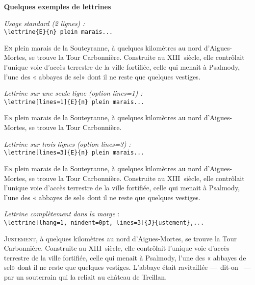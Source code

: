 \documentclass[12pt,a4paper]{article}
\begin{document}
\thispagestyle{empty}

\begin{center}
\large\bfseries Quelques exemples de lettrines
\end{center}

\vspace{\baselineskip}
\textit{Usage standard (2 lignes) :}\\
\verb+\lettrine{E}{n} plein marais...+

\lettrine{E}{n} plein marais de la Souteyranne, à quelques kilomètres
au nord d'Aigues-Mortes, se trouve la Tour Carbonnière.
Construite au XIII\ieme~siècle, elle contrôlait l'unique voie d'accès
terrestre de la ville fortifiée, celle qui menait à Psalmody,
l'une des « abbayes de sel» dont il ne reste que quelques vestiges.

\vspace{\baselineskip}
\textit{Lettrine sur une seule ligne (option {\ttfamily\upshape lines=1}) :}\\
\verb+\lettrine[lines=1]{E}{n} plein marais...+

\lettrine[lines=1]{E}{n} plein marais de la Souteyranne,
à quelques kilomètres au nord d'Aigues-Mortes, se trouve
la Tour Carbonnière.

\vspace{\baselineskip}
\textit{Lettrine sur trois lignes (option {\ttfamily\upshape lines=3}) :}\\
\verb+\lettrine[lines=3]{E}{n} plein marais...+

\lettrine[lines=3]{E}{n} plein marais de la Souteyranne,
à quelques kilomètres au nord d'Aigues-Mortes,
se trouve la Tour Carbonnière.
Construite au XIII\ieme~siècle, elle contrôlait l'unique voie d'accès
terrestre de la ville fortifiée, celle qui menait à Psalmody,
l'une des « abbayes de sel» dont il ne reste que quelques vestiges.

\vspace{\baselineskip}
\textit{Lettrine complètement dans la marge} :\\
\verb+\lettrine[lhang=1, nindent=0pt, lines=3]{J}{ustement},...+

\lettrine[lhang=1, nindent=0pt, lines=3]{J}{ustement},
à quelques kilomètres au nord d'Aigues-Mortes,
se trouve la Tour Carbonnière.
Construite au XIII\ieme~siècle, elle contrôlait l'unique voie d'accès
terrestre de la ville fortifiée, celle qui menait à Psalmody,
l'une des « abbayes de sel» dont il ne reste que quelques vestiges.
L'abbaye était ravitaillée ---~dit-on ~--- par un souterrain
qui la reliait au château de Treillan.
\end{document}
